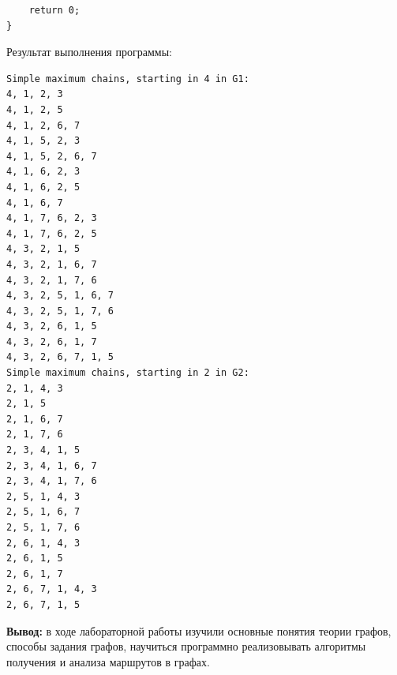 \documentclass[a4paper,14pt]{extarticle}
\begin{document}
\begin{enumerate}[1.]
\begin{verbatim}
    return 0;
}
        \end{verbatim}
        Результат выполнения программы:
        \begin{verbatim}
Simple maximum chains, starting in 4 in G1:
4, 1, 2, 3
4, 1, 2, 5
4, 1, 2, 6, 7
4, 1, 5, 2, 3
4, 1, 5, 2, 6, 7
4, 1, 6, 2, 3
4, 1, 6, 2, 5
4, 1, 6, 7
4, 1, 7, 6, 2, 3
4, 1, 7, 6, 2, 5
4, 3, 2, 1, 5
4, 3, 2, 1, 6, 7
4, 3, 2, 1, 7, 6
4, 3, 2, 5, 1, 6, 7
4, 3, 2, 5, 1, 7, 6
4, 3, 2, 6, 1, 5
4, 3, 2, 6, 1, 7
4, 3, 2, 6, 7, 1, 5
Simple maximum chains, starting in 2 in G2:
2, 1, 4, 3
2, 1, 5
2, 1, 6, 7
2, 1, 7, 6
2, 3, 4, 1, 5
2, 3, 4, 1, 6, 7
2, 3, 4, 1, 7, 6
2, 5, 1, 4, 3
2, 5, 1, 6, 7
2, 5, 1, 7, 6
2, 6, 1, 4, 3
2, 6, 1, 5
2, 6, 1, 7
2, 6, 7, 1, 4, 3
2, 6, 7, 1, 5
        \end{verbatim}


        \end{enumerate}

\textbf{Вывод: } в ходе лабораторной работы изучили основные понятия теории графов, способы
задания графов, научиться программно реализовывать
алгоритмы получения и анализа маршрутов в графах.
\end{document}

